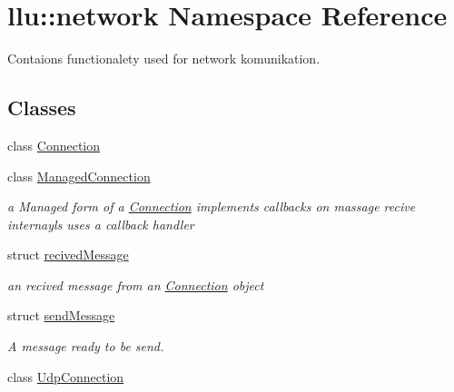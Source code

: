 \hypertarget{namespacellu_1_1network}{\section{llu\+:\+:network Namespace Reference}
\label{namespacellu_1_1network}
}


Contaions functionalety used for network komunikation.  


\subsection*{Classes}
\begin{DoxyCompactItemize}
\item 
class \hyperlink{classllu_1_1network_1_1_connection}{Connection}
\item 
class \hyperlink{classllu_1_1network_1_1_managed_connection}{Managed\+Connection}
\begin{DoxyCompactList}\small\item\em a Managed form of a \hyperlink{classllu_1_1network_1_1_connection}{Connection} implements callbacks on massage recive internayls uses a callback handler \end{DoxyCompactList}\item 
struct \hyperlink{structllu_1_1network_1_1recived_message}{recived\+Message}
\begin{DoxyCompactList}\small\item\em an recived message from an \hyperlink{classllu_1_1network_1_1_connection}{Connection} object \end{DoxyCompactList}\item 
struct \hyperlink{structllu_1_1network_1_1send_message}{send\+Message}
\begin{DoxyCompactList}\small\item\em A message ready to be send. \end{DoxyCompactList}\item 
class \hyperlink{classllu_1_1network_1_1_udp_connection}{Udp\+Connection}
\end{DoxyCompactItemize}
